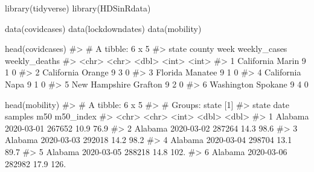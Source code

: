 \documentclass[
  letterpaper,
]{latex/krantz}
\makeatletter
\newenvironment{Shaded}{\begin{snugshade}}{\end{snugshade}}
\newcommand{\CommentTok}[1]{\textcolor[rgb]{0.37,0.37,0.37}{#1}}
\newcommand{\FunctionTok}[1]{\textcolor[rgb]{0.28,0.35,0.67}{#1}}
\newcommand{\NormalTok}[1]{\textcolor[rgb]{0.00,0.23,0.31}{#1}}
\newenvironment{kframe}{%
\medskip{}
\setlength{\fboxsep}{.8em}
 \def\at@end@of@kframe{}%
 \ifinner\ifhmode%
  \def\at@end@of@kframe{\end{minipage}}%
  \begin{minipage}{\columnwidth}%
 \fi\fi%
 \def\FrameCommand##1{\hskip\@totalleftmargin \hskip-\fboxsep
 \colorbox{shadecolor}{##1}\hskip-\fboxsep
     \hskip-\linewidth \hskip-\@totalleftmargin \hskip\columnwidth}%
 \MakeFramed {\advance\hsize-\width
   \@totalleftmargin\z@ \linewidth\hsize
   \@setminipage}}%
 {\par\unskip\endMakeFramed%
 \at@end@of@kframe}
\renewenvironment{Shaded}{\begin{kframe}}{\end{kframe}}
\makeatother
\begin{document}
\begin{Shaded}
\begin{Highlighting}[]
\FunctionTok{library}\NormalTok{(tidyverse)}
\FunctionTok{library}\NormalTok{(HDSinRdata)}

\FunctionTok{data}\NormalTok{(covidcases)}
\FunctionTok{data}\NormalTok{(lockdowndates)}
\FunctionTok{data}\NormalTok{(mobility)}
\end{Highlighting}
\end{Shaded}

\begin{Shaded}
\begin{Highlighting}[]
\FunctionTok{head}\NormalTok{(covidcases)}
\CommentTok{\#\textgreater{} \# A tibble: 6 x 5}
\CommentTok{\#\textgreater{}   state         county   week weekly\_cases weekly\_deaths}
\CommentTok{\#\textgreater{}   \textless{}chr\textgreater{}         \textless{}chr\textgreater{}   \textless{}dbl\textgreater{}        \textless{}int\textgreater{}         \textless{}int\textgreater{}}
\CommentTok{\#\textgreater{} 1 California    Marin       9            1             0}
\CommentTok{\#\textgreater{} 2 California    Orange      9            3             0}
\CommentTok{\#\textgreater{} 3 Florida       Manatee     9            1             0}
\CommentTok{\#\textgreater{} 4 California    Napa        9            1             0}
\CommentTok{\#\textgreater{} 5 New Hampshire Grafton     9            2             0}
\CommentTok{\#\textgreater{} 6 Washington    Spokane     9            4             0}
\end{Highlighting}
\end{Shaded}

\begin{Shaded}
\begin{Highlighting}[]
\FunctionTok{head}\NormalTok{(mobility)}
\CommentTok{\#\textgreater{} \# A tibble: 6 x 5}
\CommentTok{\#\textgreater{} \# Groups:   state [1]}
\CommentTok{\#\textgreater{}   state   date       samples   m50 m50\_index}
\CommentTok{\#\textgreater{}   \textless{}chr\textgreater{}   \textless{}chr\textgreater{}        \textless{}int\textgreater{} \textless{}dbl\textgreater{}     \textless{}dbl\textgreater{}}
\CommentTok{\#\textgreater{} 1 Alabama 2020{-}03{-}01  267652  10.9      76.9}
\CommentTok{\#\textgreater{} 2 Alabama 2020{-}03{-}02  287264  14.3      98.6}
\CommentTok{\#\textgreater{} 3 Alabama 2020{-}03{-}03  292018  14.2      98.2}
\CommentTok{\#\textgreater{} 4 Alabama 2020{-}03{-}04  298704  13.1      89.7}
\CommentTok{\#\textgreater{} 5 Alabama 2020{-}03{-}05  288218  14.8     102. }
\CommentTok{\#\textgreater{} 6 Alabama 2020{-}03{-}06  282982  17.9     126.}
\end{Highlighting}
\end{Shaded}
\end{document}
